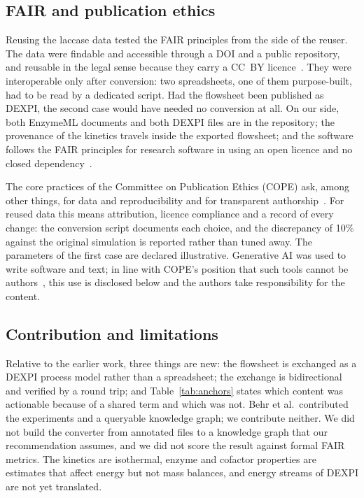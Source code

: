 \documentclass[preprint,12pt]{elsarticle}
\begin{document}
\subsection{FAIR and publication ethics}

Reusing the laccase data tested the FAIR principles from the side of the
reuser. The data were findable and accessible through a DOI and a public
repository, and reusable in the legal sense because they carry a CC~BY
licence~\cite{behr2024data}. They were interoperable only after
conversion: two spreadsheets, one of them purpose-built, had to be read by
a dedicated script. Had the flowsheet been published as DEXPI, the second
case would have needed no conversion at all. On our side, both EnzymeML
documents and both DEXPI files are in the repository; the provenance of
the kinetics travels inside the exported flowsheet; and the software
follows the FAIR principles for research software in using an open
licence and no closed dependency~\cite{barker2022}.

The core practices of the Committee on Publication Ethics (COPE) ask,
among other things, for data and reproducibility and for transparent
authorship~\cite{cope_core}. For reused data this means attribution,
licence compliance and a record of every change: the conversion script
documents each choice, and the discrepancy of 10\% against the original
simulation is reported rather than tuned away. The parameters of the first
case are declared illustrative. Generative AI was used to write software
and text; in line with COPE's position that such tools cannot be
authors~\cite{cope_ai}, this use is disclosed below and the authors take
responsibility for the content.

\subsection{Contribution and limitations}

Relative to the earlier work, three things are new: the flowsheet is
exchanged as a DEXPI process model rather than a spreadsheet; the exchange
is bidirectional and verified by a round trip; and
Table~\ref{tab:anchors} states which content was actionable because of a
shared term and which was not. Behr et al.\ contributed the experiments
and a queryable knowledge graph; we contribute neither. We did not build
the converter from annotated files to a knowledge graph that our
recommendation assumes, and we did not score the result against formal
FAIR metrics. The kinetics are isothermal, enzyme and cofactor properties
are estimates that affect energy but not mass balances, and energy streams
of DEXPI are not yet translated.
\end{document}
